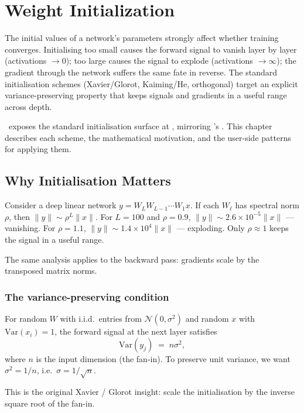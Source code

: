 \chapter{Weight Initialization}
\label{ch:initialization}

The initial values of a network's parameters strongly affect
whether training converges. Initialising too small causes the
forward signal to vanish layer by layer (activations $\to 0$);
too large causes the signal to explode (activations $\to
\infty$); the gradient through the network suffers the same fate
in reverse. The standard initialisation schemes
(Xavier/Glorot, Kaiming/He, orthogonal) target an explicit
variance-preserving property that keeps signals and gradients in
a useful range across depth.

\Lucid\ exposes the standard initialisation surface at
, mirroring 's
. This chapter describes each scheme, the
mathematical motivation, and the user-side patterns for applying
them.

\section{Why Initialisation Matters}
\label{sec:initialization:why}

Consider a deep linear network $y = W_L W_{L-1} \cdots W_1 x$.
If each $W_\ell$ has spectral norm $\rho$, then $\|y\| \sim
\rho^L \|x\|$. For $L = 100$ and $\rho = 0.9$, $\|y\| \sim
2.6 \times 10^{-5} \|x\|$ --- vanishing. For $\rho = 1.1$,
$\|y\| \sim 1.4 \times 10^4 \|x\|$ --- exploding. Only $\rho
\approx 1$ keeps the signal in a useful range.

The same analysis applies to the backward pass: gradients scale
by the transposed matrix norms.

\subsection{The variance-preserving condition}
\label{ssec:initialization:var_preserving}

For random $W$ with i.i.d.\ entries from $\mathcal{N}(0,
\sigma^2)$ and random $x$ with $\mathrm{Var}(x_i) = 1$, the
forward signal at the next layer satisfies
\[
\mathrm{Var}(y_j) \;=\; n \sigma^2,
\]
where $n$ is the input dimension (the fan-in). To preserve
unit variance, we want $\sigma^2 = 1/n$, i.e.\ $\sigma =
1/\sqrt{n}$.

This is the original Xavier / Glorot insight: scale the
initialisation by the inverse square root of the fan-in.

